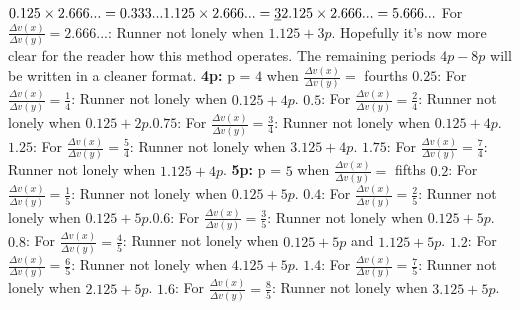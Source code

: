 \documentclass[12pt, a4paper]{article}
\begin{document}
\newline
\newline
$0.125\times2.666... = 0.333... \newline 1.125\times2.666... = \underline{3} \newline 2.125\times2.666... = 5.666... \newline$ For $\frac{\Delta v(x)}{\Delta v(y)} = 2.666...$: Runner not lonely when $1.125+3p$.
\newline
\newline
Hopefully it's now more clear for the reader how this method operates. The remaining periods $4p-8p$ will be written in a cleaner format.
\newline
\textbf{4p:}
p = $4$ when $\frac{\Delta v(x)}{\Delta v(y)} =$ fourths
\newline
\newline
$0.25$: For $\frac{\Delta v(x)}{\Delta v(y)} = \frac{1}{4}$: Runner not lonely when $0.125+4p$. \newline $0.5$: For $\frac{\Delta v(x)}{\Delta v(y)} = \frac{2}{4}$: Runner not lonely when $0.125+2p$.\newline $0.75$: For $\frac{\Delta v(x)}{\Delta v(y)} = \frac{3}{4}$: Runner not lonely when $0.125+4p$. \newline $1.25$: For $\frac{\Delta v(x)}{\Delta v(y)} = \frac{5}{4}$: Runner not lonely when $3.125+4p$. \newline $1.75$: For $\frac{\Delta v(x)}{\Delta v(y)} = \frac{7}{4}$: Runner not lonely when $1.125+4p$.
\newline
\newline
\textbf{5p:}
p = $5$ when $\frac{\Delta v(x)}{\Delta v(y)} =$ fifths
\newline
\newline
$0.2$: For $\frac{\Delta v(x)}{\Delta v(y)} = \frac{1}{5}$: Runner not lonely when $0.125+5p$. \newline $0.4$: For $\frac{\Delta v(x)}{\Delta v(y)} = \frac{2}{5}$: Runner not lonely when $0.125+5p$.\newline $0.6$: For $\frac{\Delta v(x)}{\Delta v(y)} = \frac{3}{5}$: Runner not lonely when $0.125+5p$. \newline $0.8$: For $\frac{\Delta v(x)}{\Delta v(y)} = \frac{4}{5}$: Runner not lonely when $0.125+5p$ and $1.125+5p$. \newline $1.2$: For $\frac{\Delta v(x)}{\Delta v(y)} = \frac{6}{5}$: Runner not lonely when $4.125+5p$. \newline $1.4$: For $\frac{\Delta v(x)}{\Delta v(y)} = \frac{7}{5}$: Runner not lonely when $2.125+5p$. \newline $1.6$: For $\frac{\Delta v(x)}{\Delta v(y)} = \frac{8}{5}$: Runner not lonely when $3.125+5p$.
\end{document}
